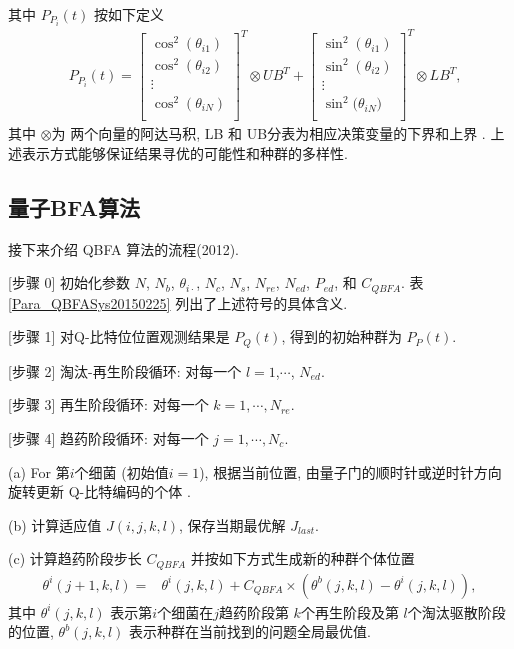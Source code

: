 其中 $P_{P_i}(t)$ 按如下定义
\begin{align*}
&P_{P_i}(t)=
\left [
\begin{array}{cccc}
\cos^2(\theta_{i1})\\ \cos^2(\theta_{i2})\\ \vdots\\ \cos^2(\theta_{iN})\\
\end{array}
\right]^T\otimes UB^T
+\left [
\begin{array}{cccc}
\sin^2(\theta_{i1})\\ \sin^2(\theta_{i2})\\ \vdots\\ \sin^2(\theta_{iN} \big)\\
\end{array}
\right]^T\otimes LB^T,
\end{align*}
其中 $\otimes$为 两个向量的阿达马积, LB 和 UB分表为相应决策变量的下界和上界 .
上述表示方式能够保证结果寻优的可能性和种群的多样性.
\subsection{量子BFA算法}
接下来介绍 QBFA 算法的流程(2012).

[步骤 0] 初始化参数 $N$, $N_b$, $\theta_{i\cdot}$, $N_c$, $N_s$, $N_{re}$, $N_{ed}$, $P_{ed}$, 和 $C_{QBFA}$.
表 \ref{Para_QBFASys20150225} 列出了上述符号的具体含义.

[步骤 1] 对Q-比特位位置观测结果是 $P_Q (t)$, 得到的初始种群为 $P_P(t)$.

[步骤 2] 淘汰-再生阶段循环: 对每一个 $l=1$,$\cdots$, $N_{ed}$.

[步骤 3] 再生阶段循环: 对每一个 $k=1,\cdots,N_{re}$.

[步骤 4] 趋药阶段循环:  对每一个 $j=1,\cdots,N_{c}$.

\quad\quad (a) \textcolor[rgb]{0,0,1}{For} 第$i$个细菌 (初始值$i=1$), 根据当前位置, 由量子门的顺时针或逆时针方向旋转更新 Q-比特编码的个体 .

\quad\quad (b) 计算适应值 $J(i,j,k,l)$, 保存当期最优解 $J_{last}$.

\quad\quad (c) 计算趋药阶段步长 $C_{QBFA}$ 并按如下方式生成新的种群个体位置
\begin{align}
    \theta^i(j+1,k,l)=&\theta^i(j,k,l)+C_{QBFA} \times(\theta^b(j,k,l)-\theta^i(j,k,l)),
\end{align}
其中 $\theta^i(j,k,l)$ 表示第$i$个细菌在$j$趋药阶段第 $k$个再生阶段及第 $l$个淘汰驱散阶段 的位置, $\theta^b(j,k,l)$ 表示种群在当前找到的问题全局最优值.

